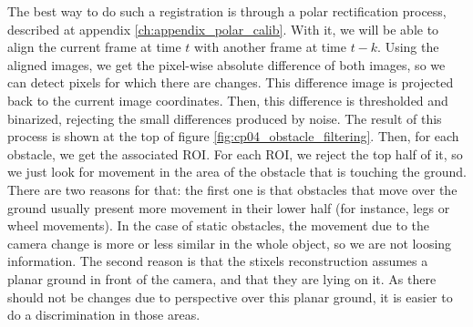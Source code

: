 The best way to do such a registration is through a polar rectification process, described at appendix \ref{ch:appendix_polar_calib}. With it, we will be able to align the current frame at time $t$ with another frame at time $t - k$. Using the aligned images, we get the pixel-wise absolute difference of both images, so we can detect pixels for which there are changes. This difference image is projected back to the current image coordinates. Then, this difference is thresholded and binarized, rejecting the small differences produced by noise. The result of this process is shown at the top of figure \ref{fig:cp04_obstacle_filtering}. Then, for each obstacle, we get the associated \ac{ROI}. For each \ac{ROI}, we reject the top half of it, so we just look for movement in the area of the obstacle that is touching the ground. There are two reasons for that: the first one is that obstacles that move over the ground usually present more movement in their lower half (for instance, legs or wheel movements). In the case of static obstacles, the movement due to the camera change is more or less similar in the whole object, so we are not loosing information. The second reason is that the stixels reconstruction assumes a planar ground in front of the camera, and that they are lying on it. As there should not be changes due to perspective over this planar ground, it is easier to do a discrimination in those areas.

